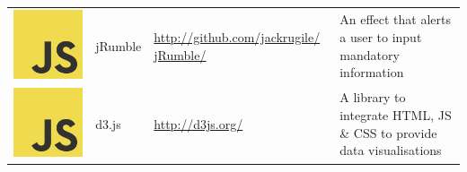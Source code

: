 \documentclass[12pt, a4paper]{article}
\begin{document}
\begin{table}[H]
{\begin{tabular}{|m{0.3cm}m{2.4cm}m{5.6cm}m{8.8cm}|}
\includegraphics[scale=0.02]{js.png}& jRumble & \href{http://github.com/jackrugile/jRumble/}{http://github.com/jackrugile/ jRumble/} & An effect that alerts a user to input mandatory information \\
\includegraphics[scale=0.02]{js.png}& d3.js & \href{http://d3js.org/}{http://d3js.org/} & A library to integrate HTML, JS \& CSS to provide data visualisations \\

\end{tabular}}
\end{table}
\end{document}
